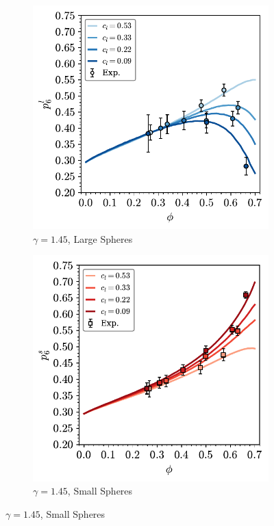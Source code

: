 \begin{figure}[bt]
      \begin{subfigure}[b]{0.48\textwidth}
         \centering
         \includegraphics[width=\textwidth]{./figures/quasi2d/bi_ssr_l_phi_p6.pdf}
         \caption{$\gamma=1.45$, Large Spheres}
         \label{fig:bi3}
     \end{subfigure}
     \hfill
     \begin{subfigure}[b]{0.48\textwidth}
         \centering
         \includegraphics[width=\textwidth]{./figures/quasi2d/bi_ssr_s_phi_p6.pdf}
         \caption{$\gamma=1.45$, Small Spheres}
         \label{fig:bi4}
     \end{subfigure}
     \hfill
    

\end{figure}
